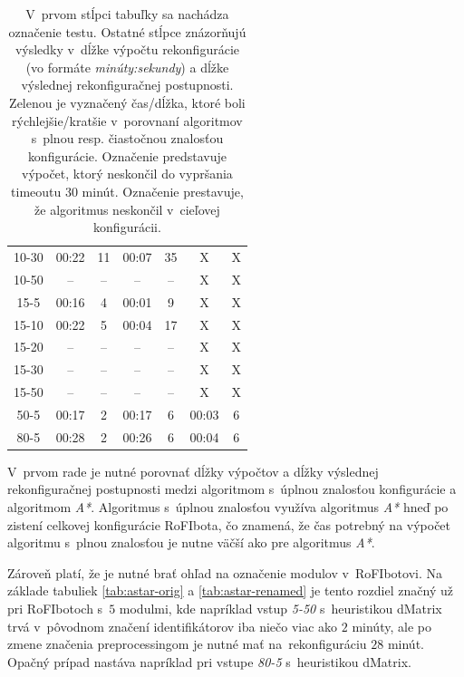 \documentclass[
  printed, %
  oneside, %
  notable,   %
  nolof,     %
  nolot,     %
]{fithesis3}
\begin{document}
\begin{table}[hp!]
\begin{tabular}{c|cc|cc|cc}
10-30  & \cellcolor{table-green}00:22 & \cellcolor{table-green}11  & 00:07 & 35  & X & X \\
10-50  & -- & --  & -- & --  & X & X \\ \hline
15-5  & \cellcolor{table-green}00:16 & \cellcolor{table-green}4  & 00:01 & 9  & X & X  \\
15-10  & \cellcolor{table-green}00:22 & \cellcolor{table-green}5  & 00:04 & 17  & X & X \\
15-20  & -- & --  & -- & --  & X & X \\
15-30  & -- & --  & -- & --  & X & X \\
15-50  & -- & --  & -- & --  & X & X \\ \hline
50-5  & 00:17 & \cellcolor{table-green}2  & 00:17 & 6  & \cellcolor{table-green}00:03 & 6 \\ \hline
80-5  & 00:28 & \cellcolor{table-green}2  & 00:26 & 6  & \cellcolor{table-green}00:04 & 6 \\
\end{tabular}%
\caption{V~prvom stĺpci tabuľky sa nachádza označenie testu. Ostatné stĺpce znázorňujú výsledky v~dĺžke výpočtu rekonfigurácie (vo formáte \textit{minúty:sekundy}) a dĺžke výslednej rekonfiguračnej postupnosti. \\ \colorbox{table-green}{Zelenou} je vyznačený čas/dĺžka, ktoré boli rýchlejšie/kratšie v~porovnaní algoritmov s~plnou resp. čiastočnou znalosťou konfigurácie. Označenie \mbox{\uv{--}} predstavuje výpočet, ktorý neskončil do vypršania timeoutu 30 minút. Označenie  prestavuje, že algoritmus neskončil v~cieľovej konfigurácii. }
\label{tab:all}
\end{table}

V~prvom rade je nutné porovnať dĺžky výpočtov a dĺžky výslednej rekonfiguračnej postupnosti medzi algoritmom s~úplnou znalosťou konfigurácie a algoritmom \textit{A*}. Algoritmus s~úplnou znalosťou využíva algoritmus \textit{A*} hneď po zistení celkovej konfigurácie RoFIbota, čo znamená, že čas potrebný na výpočet algoritmu s~plnou znalosťou je nutne väčší ako pre algoritmus \textit{A*}. 

Zároveň platí, že je nutné brať ohľad na označenie modulov v~RoFIbotovi. Na základe tabuliek \ref{tab:astar-orig} a \ref{tab:astar-renamed} je tento rozdiel značný už pri RoFIbotoch s~$5$ modulmi, kde napríklad vstup \textit{5-50} s~heuristikou dMatrix trvá v~pôvodnom značení identifikátorov iba niečo viac ako $2$ minúty, ale po zmene značenia preprocessingom je nutné mať na~rekonfiguráciu $28$ minút. Opačný prípad nastáva napríklad pri vstupe \textit{80-5} s~heuristikou dMatrix. 
\end{document}
